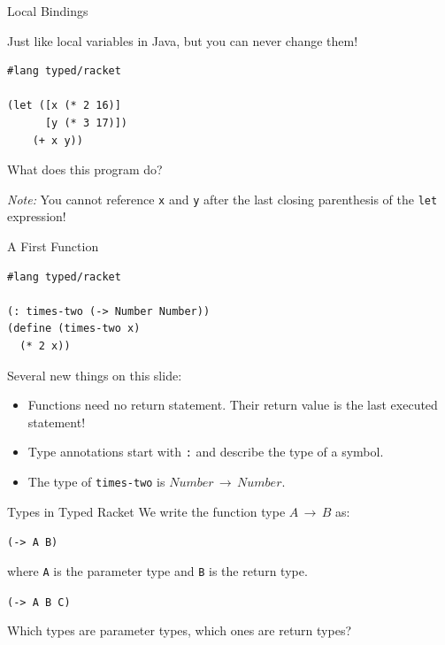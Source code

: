 \documentclass{beamer}
\begin{document}
\begin{frame}[fragile]{Local Bindings}

Just like local variables in Java, but you can never change them!

\begin{lstlisting}
#lang typed/racket

(let ([x (* 2 16)]
      [y (* 3 17)])
    (+ x y))
\end{lstlisting}

What does this program do?

\vspace{1cm}

\textit{Note:} You cannot reference \lstinline{x} and \lstinline{y} after the last closing parenthesis of the \lstinline{let} expression!

\end{frame}

\begin{frame}[fragile]{A First Function}
\begin{lstlisting}
#lang typed/racket

(: times-two (-> Number Number))
(define (times-two x)
  (* 2 x))
\end{lstlisting}

\pause{}

Several new things on this slide:

\begin{itemize}
\pause{} \item Functions need no return statement. Their return value is the last executed statement!
\pause{} \item Type annotations start with \lstinline{:} and describe the type of a symbol.
\pause{} \item The type of \lstinline{times-two} is $Number \, \rightarrow \, Number$.
\end{itemize}
\end{frame}

\begin{frame}[fragile]{Types in Typed Racket}
We write the function type $A \, \rightarrow \, B$ as:

\begin{center}
  \lstinline{(-> A B)}
\end{center}

where \lstinline{A} is the parameter type and \lstinline{B} is the return type.

\vspace{1.5cm}

\pause{}

\begin{center}
  \lstinline{(-> A B C)}
\end{center}

Which types are parameter types, which ones are return types?
\end{frame}
\end{document}
